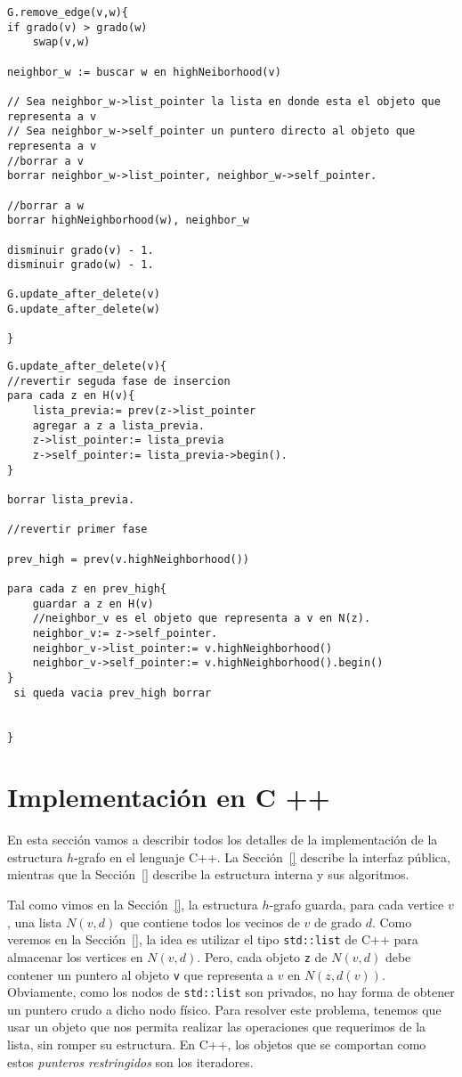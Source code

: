 \documentclass[a4paper,12pt]{article}
\begin{document}
\begin{lstlisting}
G.remove_edge(v,w){
if grado(v) > grado(w)
	swap(v,w)
    
neighbor_w := buscar w en highNeiborhood(v)

// Sea neighbor_w->list_pointer la lista en donde esta el objeto que representa a v
// Sea neighbor_w->self_pointer un puntero directo al objeto que representa a v
//borrar a v
borrar neighbor_w->list_pointer, neighbor_w->self_pointer.

//borrar a w
borrar highNeighborhood(w), neighbor_w

disminuir grado(v) - 1.
disminuir grado(w) - 1.

G.update_after_delete(v)
G.update_after_delete(w)

}
\end{lstlisting}

\begin{lstlisting}
G.update_after_delete(v){
//revertir seguda fase de insercion
para cada z en H(v){
	lista_previa:= prev(z->list_pointer
    agregar a z a lista_previa.
    z->list_pointer:= lista_previa
    z->self_pointer:= lista_previa->begin().
}

borrar lista_previa.

//revertir primer fase

prev_high = prev(v.highNeighborhood())

para cada z en prev_high{
	guardar a z en H(v)
    //neighbor_v es el objeto que representa a v en N(z).
    neighbor_v:= z->self_pointer.
    neighbor_v->list_pointer:= v.highNeighborhood()
    neighbor_v->self_pointer:= v.highNeighborhood().begin()
}
 si queda vacia prev_high borrar


}
\end{lstlisting}


\section{Implementación en C ++}
\label{sec:c++}

En esta sección vamos a describir todos los detalles de la implementación de la estructura $h$-grafo en el lenguaje C++.  La Sección~\ref{} describe la interfaz pública, mientras que la Sección~\ref{} describe la estructura interna y sus algoritmos.  

Tal como vimos en la Sección~\ref{}, la estructura $h$-grafo guarda, para cada vertice $v$, una lista $N(v, d)$ que contiene todos los vecinos de $v$ de grado $d$.  Como veremos en la Sección~\ref{}, la idea es utilizar el tipo \texttt{std::list} de C++ para almacenar los vertices en $N(v, d)$.  Pero, cada objeto \texttt{z} de $N(v, d)$ debe contener un puntero al objeto \texttt{v} que representa a $v$ en $N(z, d(v))$.  Obviamente, como los nodos de \texttt{std::list} son privados, no hay forma de obtener un puntero crudo a dicho nodo físico.  Para resolver este problema, tenemos que usar un objeto que nos permita realizar las operaciones que requerimos de la lista, sin romper su estructura.  En C++, los objetos que se comportan como estos \emph{punteros restringidos} son los iteradores.  
\end{document}
